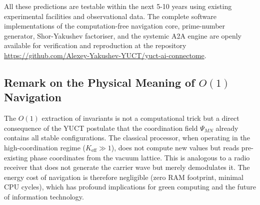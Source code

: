 \documentclass[12pt,a4paper]{article}
\theoremstyle{remark}
\newcommand{\Keff}{K_{\mathrm{eff}}}
\begin{document}
	All these predictions are testable within the next 5-10 years using existing experimental facilities and observational data. The complete software implementations of the computation-free navigation core, prime-number generator, Shor-Yakushev factoriser, and the systemic A2A engine are openly available for verification and reproduction at the repository 
	\url{https://github.com/Alexey-Yakushev-YUCT/yuct-ai-connectome}.
	
	\subsection*{Remark on the Physical Meaning of \(O(1)\) Navigation}
	The \(O(1)\) extraction of invariants is not a computational trick but a direct consequence of the YUCT postulate that the coordination field \(\Psi_{MN}\) already contains all stable configurations. The classical processor, when operating in the high-coordination regime (\(\Keff \gg 1\)), does not compute new values but reads pre-existing phase coordinates from the vacuum lattice. This is analogous to a radio receiver that does not generate the carrier wave but merely demodulates it. The energy cost of navigation is therefore negligible (zero RAM footprint, minimal CPU cycles), which has profound implications for green computing and the future of information technology.
	
\end{document}
